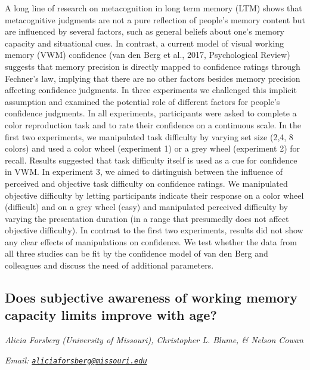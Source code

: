 \documentclass[12pt,]{book}
\begin{document}
A long line of research on metacognition in long term memory (LTM) shows that metacognitive judgments are not a pure reflection of people's memory content but are influenced by several factors, such as general beliefs about one's memory capacity and situational cues. In contrast, a current model of visual working memory (VWM) confidence (van den Berg et al., 2017, Psychological Review) suggests that memory precision is directly mapped to confidence ratings through Fechner's law, implying that there are no other factors besides memory precision affecting confidence judgments. In three experiments we challenged this implicit assumption and examined the potential role of different factors for people's confidence judgments. In all experiments, participants were asked to complete a color reproduction task and to rate their confidence on a continuous scale. In the first two experiments, we manipulated task difficulty by varying set size (2,4, 8 colors) and used a color wheel (experiment 1) or a grey wheel (experiment 2) for recall. Results suggested that task difficulty itself is used as a cue for confidence in VWM. In experiment 3, we aimed to distinguish between the influence of perceived and objective task difficulty on confidence ratings. We manipulated objective difficulty by letting participants indicate their response on a color wheel (difficult) and on a grey wheel (easy) and manipulated perceived difficulty by varying the presentation duration (in a range that presumedly does not affect objective difficulty). In contrast to the first two experiments, results did not show any clear effects of manipulations on confidence. We test whether the data from all three studies can be fit by the confidence model of van den Berg and colleagues and discuss the need of additional parameters.

\hypertarget{does-subjective-awareness-of-working-memory-capacity-limits-improve-with-age}{%
\subsection{Does subjective awareness of working memory capacity limits improve with age?}\label{does-subjective-awareness-of-working-memory-capacity-limits-improve-with-age}}

\emph{Alicia Forsberg (University of Missouri), Christopher L. Blume, \& Nelson Cowan}

\emph{Email: \href{mailto:aliciaforsberg@missouri.edu}{\nolinkurl{aliciaforsberg@missouri.edu}}}
\end{document}
